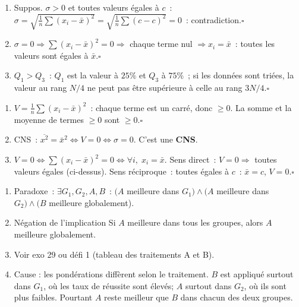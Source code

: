 \begin{enumerate}
  \item Suppos. $\sigma>0$ et toutes valeurs \'egales \`a $c$~:
        $\sigma=\sqrt{\frac{1}{n}\sum(x_i-\bar{x})^2}=\sqrt{\frac{1}{n}\sum(c-c)^2}=0$~: contradiction.\hfill$\square$
  \item $\sigma=0\Rightarrow\sum(x_i-\bar{x})^2=0\Rightarrow$ chaque terme nul $\Rightarrow x_i=\bar{x}$~:
        toutes les valeurs sont \'egales \`a $\bar{x}$.\hfill$\square$
  \item $Q_1>Q_3$~: $Q_1$ est la valeur \`a $25\%$ et $Q_3$ \`a $75\%$~; si les donn\'ees sont tri\'ees,
        la valeur au rang $N/4$ ne peut pas \^etre sup\'erieure \`a celle au rang $3N/4$.\hfill$\square$
\end{enumerate}


\begin{enumerate}
  \item $V=\frac{1}{n}\sum(x_i-\bar{x})^2$~: chaque terme est un carr\'e, donc $\geq0$.
        La somme et la moyenne de termes $\geq0$ sont $\geq0$.\hfill$\square$
  \item CNS~: $\overline{x^2}=\bar{x}^2\Leftrightarrow V=0\Leftrightarrow\sigma=0$. C'est une \textbf{CNS}.
  \item $V=0\Leftrightarrow\sum(x_i-\bar{x})^2=0\Leftrightarrow\forall i,\;x_i=\bar{x}$.
        Sens direct~: $V=0\Rightarrow$ toutes valeurs \'egales (ci-dessus).
        Sens r\'eciproque~: toutes \'egales \`a $c$~: $\bar{x}=c$, $V=0$.\hfill$\square$
\end{enumerate}


\begin{enumerate}
  \item Paradoxe~: $\exists G_1,G_2,A,B$~: $(A$ meilleure dans $G_1)\wedge(A$ meilleure dans $G_2)
        \wedge(B$ meilleure globalement).
  \item N\'egation de l'implication \og Si $A$ meilleure dans tous les groupes,
        alors $A$ meilleure globalement\fg.
  \item Voir exo 29 ou d\'efi 1 (tableau des traitements A et B).
  \item Cause : les pond\'erations diff\`erent selon le traitement.
        $B$ est appliqu\'e surtout dans $G_1$, o\`u les taux de r\'eussite
        sont \'elev\'es; $A$ surtout dans $G_2$, o\`u ils sont plus faibles.
        Pourtant $A$ reste meilleur que $B$ dans chacun des deux groupes.
\end{enumerate}

